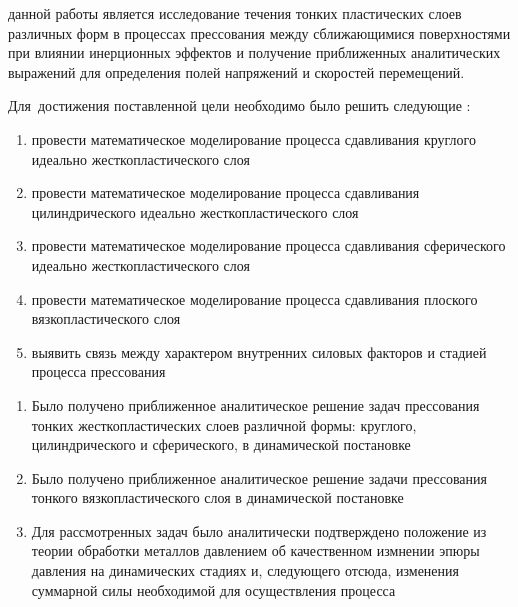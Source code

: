 \ifsynopsis
\else
\fi


{\aim} данной работы является исследование течения тонких пластических слоев различных форм в процессах прессования между сближающимися поверхностями при влиянии инерционных эффектов и получение приближенных аналитических выражений для определения полей напряжений и скоростей перемещений.

Для~достижения поставленной цели необходимо было решить следующие {\tasks}:
\begin{enumerate}[beginpenalty=10000] %
    \item провести математическое моделирование процесса сдавливания круглого идеально жесткопластического слоя
    \item провести математическое моделирование процесса сдавливания цилиндрического идеально жесткопластического слоя
    \item провести математическое моделирование процесса сдавливания сферического идеально жесткопластического слоя
    \item провести математическое моделирование процесса сдавливания плоского вязкопластического слоя
    \item выявить связь между характером внутренних силовых факторов и стадией процесса прессования
\end{enumerate}


{\novelty}
\begin{enumerate}[beginpenalty=10000] %
    \item Было получено приближенное аналитическое решение задач прессования тонких жесткопластических слоев различной формы: круглого, цилиндрического и сферического, в динамической постановке
    \item Было получено приближенное аналитическое решение задачи прессования тонкого вязкопластического слоя в динамической постановке
    \item Для рассмотренных задач было аналитически подтверждено положение из теории обработки металлов давлением об качественном измнении эпюры давления  на динамических стадиях и, следующего отсюда, изменения суммарной силы необходимой для осуществления процесса
\end{enumerate}

